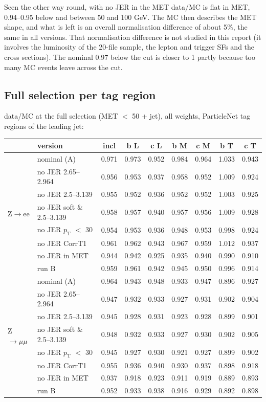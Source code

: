 \documentclass[11pt,a4paper]{article}
\newcommand{\Zee}{Z$\to$ee}
\newcommand{\Zmm}{Z$\to\mu\mu$}
\newcommand{\pt}{$p_\mathrm{T}$}
\begin{document}
Seen the other way round, with no JER in the MET data/MC is flat in MET, 0.94--0.95 below and between 50 and 100 GeV. The
MC then describes the MET shape, and what is left is an overall normalisation difference of about 5\%, the same in all versions.
That normalisation difference is not studied in this report (it involves the luminosity of the 20-file sample, the lepton and
trigger SFs and the cross sections). The nominal 0.97 below the cut is closer to 1 partly because too many MC events leave
across the cut.

\subsection{Full selection per tag region}
data/MC at the full selection (MET $<$ 50 + jet), all weights, ParticleNet tag regions of the leading jet:
\begin{center}
\small
\begin{tabular}{l l ccccccc}
\toprule
 & version & incl & b L & c L & b M & c M & b T & c T \\
\midrule
\multirow{8}{*}{\Zee}
& nominal (A) & 0.971 & 0.973 & 0.952 & 0.984 & 0.964 & 1.033 & 0.943 \\
& no JER 2.65--2.964 & 0.956 & 0.953 & 0.937 & 0.958 & 0.952 & 1.009 & 0.924 \\
& no JER 2.5--3.139 & 0.955 & 0.952 & 0.936 & 0.952 & 0.952 & 1.003 & 0.925 \\
& no JER soft \& 2.5--3.139 & 0.958 & 0.957 & 0.940 & 0.957 & 0.956 & 1.009 & 0.928 \\
& no JER \pt{} $<$ 30 & 0.954 & 0.953 & 0.936 & 0.948 & 0.953 & 0.998 & 0.924 \\
& no JER CorrT1 & 0.961 & 0.962 & 0.943 & 0.967 & 0.959 & 1.012 & 0.937 \\
& no JER in MET & 0.944 & 0.942 & 0.925 & 0.935 & 0.940 & 0.990 & 0.910 \\
& run B & 0.959 & 0.961 & 0.942 & 0.945 & 0.950 & 0.996 & 0.914 \\
\midrule
\multirow{8}{*}{\Zmm}
& nominal (A) & 0.964 & 0.943 & 0.948 & 0.933 & 0.947 & 0.896 & 0.927 \\
& no JER 2.65--2.964 & 0.947 & 0.932 & 0.933 & 0.927 & 0.931 & 0.902 & 0.904 \\
& no JER 2.5--3.139 & 0.945 & 0.928 & 0.931 & 0.923 & 0.928 & 0.899 & 0.901 \\
& no JER soft \& 2.5--3.139 & 0.948 & 0.932 & 0.933 & 0.927 & 0.930 & 0.902 & 0.905 \\
& no JER \pt{} $<$ 30 & 0.945 & 0.927 & 0.930 & 0.921 & 0.927 & 0.899 & 0.902 \\
& no JER CorrT1 & 0.955 & 0.936 & 0.940 & 0.930 & 0.937 & 0.898 & 0.918 \\
& no JER in MET & 0.937 & 0.918 & 0.923 & 0.911 & 0.919 & 0.889 & 0.893 \\
& run B & 0.952 & 0.933 & 0.938 & 0.916 & 0.929 & 0.892 & 0.898 \\
\bottomrule
\end{tabular}
\end{center}
\end{document}
